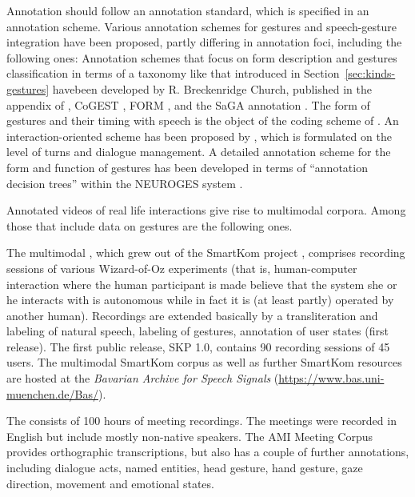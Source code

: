 \documentclass[output=paper]{langsci/langscibook}
\begin{document}
Annotation should follow an annotation standard, which is specified in an annotation scheme.
%
Various annotation schemes for gestures and speech-gesture integration have been proposed, partly differing in annotation foci, including the following ones:
%
Annotation schemes that focus on form description and gestures classification in terms of a taxonomy like that introduced in Section~\ref{sec:kinds-gestures} havebeen developed by R. Breckenridge Church, published in the appendix of \citet{McNeill:1992}, CoGEST \citep{Gibbon:et:al:2003}, FORM \citep{Martell:Osborn:Friedman:Howard:2002}, and the SaGA annotation \citep{Luecking:Bergmann:Hahn:Kopp:Rieser:2013}.
%
The form of gestures and their timing with speech is the object of the coding scheme of \citet{Kipp:Neff:Albrecht:2007}.
%
An interaction-oriented scheme has been proposed by \citet{Allwood:et:al:2007}, which is formulated on the level of turns and dialogue management.
%
A detailed annotation scheme for the form and function of gestures has been developed in terms of \enquote{annotation decision trees} within the NEUROGES system \citep{Lausberg:Sloetjes:2009}.


Annotated videos of real life interactions give rise to multimodal corpora. 
%
Among those that include data on gestures are the following ones.

The multimodal  \citep{Schiel:Steininger:Tuerk:2003}, which grew out of the SmartKom project \citep{Wahlster:2006}, comprises recording sessions of various Wizard-of-Oz experiments (that is, human-computer interaction where the human participant is made believe that the system she or he interacts with is autonomous while in fact it is (at least partly) operated by another human).
%
Recordings are extended basically by a transliteration and labeling of natural speech, labeling of gestures, annotation of user states (first release). 
%
The first public release, SKP 1.0, contains 90 recording sessions of 45 users. 
%
The multimodal SmartKom corpus as well as further SmartKom resources are hosted at the \textit{Bavarian Archive for Speech Signals} (\url{https://www.bas.uni-muenchen.de/Bas/}).


The  \citep{Carletta:et:al:2006} consists of 100 hours of meeting recordings.
%
The meetings were recorded in English but include mostly non-native speakers. 
%
The AMI Meeting Corpus provides orthographic transcriptions, but also has a couple of further annotations, including dialogue acts, named entities, head gesture, hand gesture, gaze direction, movement and emotional states.
\end{document}
